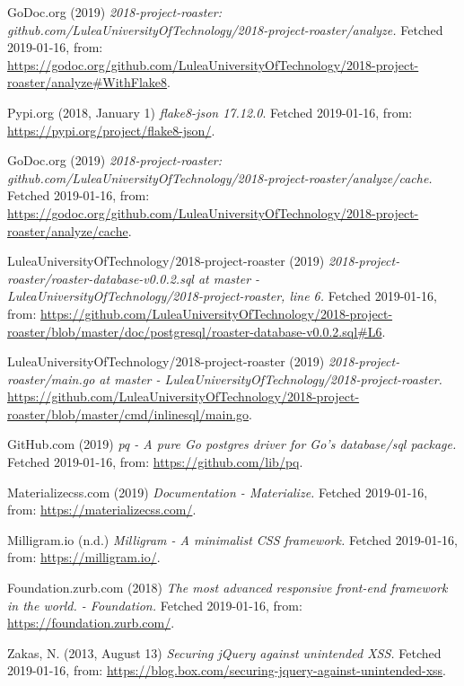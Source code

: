 \documentclass[12pt,a4paper]{report}
\begin{document}
{\begin{thebibliography}{1}
 GoDoc.org (2019) {\em 2018-project-roaster: github.com/LuleaUniversityOfTechnology/2018-project-roaster/analyze.} Fetched 2019-01-16, from: \url{https://godoc.org/github.com/LuleaUniversityOfTechnology/2018-project-roaster/analyze#WithFlake8}.

 Pypi.org (2018, January 1) {\em flake8-json 17.12.0}. Fetched 2019-01-16, from: \url{https://pypi.org/project/flake8-json/}.

 GoDoc.org (2019) {\em 2018-project-roaster: github.com/LuleaUniversityOfTechnology/2018-project-roaster/analyze/cache.} Fetched 2019-01-16, from: \url{https://godoc.org/github.com/LuleaUniversityOfTechnology/2018-project-roaster/analyze/cache}.

 LuleaUniversityOfTechnology/2018-project-roaster (2019) {\em 2018-project-roaster/roaster-database-v0.0.2.sql at master - LuleaUniversityOfTechnology/2018-project-roaster, line 6.}
Fetched 2019-01-16, from: \url{https://github.com/LuleaUniversityOfTechnology/2018-project-roaster/blob/master/doc/postgresql/roaster-database-v0.0.2.sql#L6}.

 LuleaUniversityOfTechnology/2018-project-roaster (2019) {\em 2018-project-roaster/main.go at master - LuleaUniversityOfTechnology/2018-project-roaster.} \url{https://github.com/LuleaUniversityOfTechnology/2018-project-roaster/blob/master/cmd/inlinesql/main.go}.

 GitHub.com (2019) {\em pq - A pure Go postgres driver for Go's database/sql package.} Fetched 2019-01-16, from: \url{https://github.com/lib/pq}.

 Materializecss.com (2019) {\em Documentation - Materialize.} Fetched 2019-01-16, from: \url{https://materializecss.com/}.

 Milligram.io (n.d.) {\em Milligram - A minimalist CSS framework.} Fetched 2019-01-16, from: \url{https://milligram.io/}.

 Foundation.zurb.com (2018) {\em The most advanced responsive front-end framework in the world. - Foundation.} Fetched 2019-01-16, from: \url{https://foundation.zurb.com/}.

 Zakas, N. (2013, August 13) {\em Securing jQuery against unintended XSS.} Fetched 2019-01-16, from: \url{https://blog.box.com/securing-jquery-against-unintended-xss}.

\end{thebibliography}}
\end{document}
